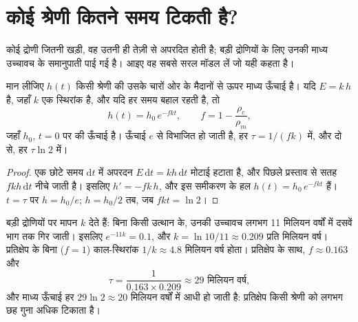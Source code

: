 \section{कोई श्रेणी कितने समय टिकती है?}

कोई द्रोणी जितनी खड़ी, वह उतनी ही तेज़ी से अपरदित होती है; बड़ी द्रोणियों के लिए  उनकी माध्य उच्चावच के समानुपाती पाई गई है। आइए वह
सबसे सरल मॉडल लें जो यही कहता है।

\begin{proposition}[किसी श्रेणी का चरघातांकी क्षय]\label{prop:g12:destruction-of-mountains:decay}
मान लीजिए $h(t)$ किसी श्रेणी की उसके चारों ओर के मैदानों से ऊपर माध्य ऊँचाई है। यदि
 $E = k\,h$ है, जहाँ $k$ एक स्थिरांक है, और यदि  हर समय
बहाल रहती है, तो
\[
  h(t) = h_0\, e^{-f k t}, \qquad f = 1 - \frac{\rho_c}{\rho_m},
\]
जहाँ $h_0$, $t = 0$ पर की ऊँचाई है। ऊँचाई $e$ से विभाजित हो जाती है,
हर $\tau = 1/(fk)$ में, और दो से, हर $\tau \ln 2$ में।
\end{proposition}

\begin{proof}
एक छोटे समय $\mathrm{d}t$ में अपरदन $E\,\mathrm{d}t
= k h\,\mathrm{d}t$ मोटाई हटाता है, और पिछले प्रस्ताव से सतह
$f k h\,\mathrm{d}t$ नीचे जाती है। इसलिए $h' = -fk\,h$, और इस
समीकरण के हल $h(t) = h_0\,e^{-fkt}$ हैं। $t = \tau$ पर $h = h_0/e$; $h = h_0/2$
तब, जब $fkt = \ln 2$।
\end{proof}

बड़ी द्रोणियों पर मापन $k$ देते हैं: बिना किसी उत्थान के, उनकी उच्चावच
लगभग 11 मिलियन वर्षों में दसवें भाग तक गिर जाती। इसलिए $e^{-11k} = 0.1$, और $k =
\ln 10/11 \approx 0.209$ प्रति मिलियन वर्ष। प्रतिक्षेप के बिना ($f = 1$)
काल-स्थिरांक $1/k \approx 4.8$ मिलियन वर्ष होता। प्रतिक्षेप के साथ, $f
\approx 0.163$ और
\[
  \tau = \frac{1}{0.163 \times 0.209} \approx 29 \text{ मिलियन वर्ष},
\]
और माध्य ऊँचाई हर $29 \ln 2 \approx 20$ मिलियन वर्षों में आधी हो जाती है:
प्रतिक्षेप किसी श्रेणी को लगभग छह गुना अधिक टिकाता है।

